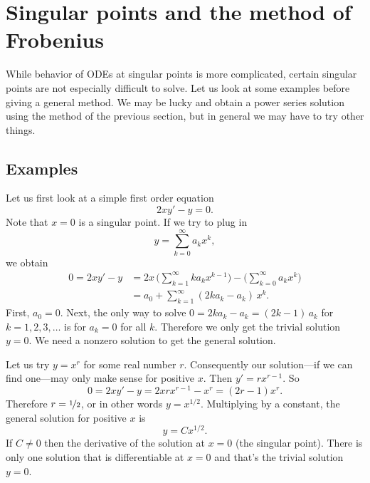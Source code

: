 
\sectionnewpage
\section{Singular points and the method of Frobenius}
\label{frobenius:section}


While behavior of ODEs at singular points is more complicated,
certain singular points are
not especially difficult to solve.  Let us look at some examples
before giving a general method.  We may be lucky and obtain a power series
solution using the method of the previous section, but in general we may
have to try other things.

\subsection{Examples}

\begin{example}
Let us first look at a simple first order equation 
\begin{equation*}
2 x y' - y = 0 .
\end{equation*}
Note that $x=0$ is a singular point.
If we try to plug in
\begin{equation*}
y = \sum_{k=0}^\infty a_k x^k ,
\end{equation*}
we obtain
\begin{equation*}
\begin{split}
0 = 2 xy'-y &= 
2x \, \Biggl( \sum_{k=1}^\infty k a_k x^{k-1}  \Biggr)
-
\Biggl( \sum_{k=0}^\infty a_k x^k \Biggr)
\\
& =
a_0 + 
\sum_{k=1}^\infty (2 k a_k - a_k) \, x^{k} .
\end{split}
\end{equation*}
First, $a_0 = 0$.  Next, the only way to solve
$0 = 2 k a_k - a_k = (2k-1) \, a_k$
for $k = 1,2,3,\dots$ is for $a_k = 0$ for all $k$.
Therefore we only get the trivial solution $y=0$.  We need
a nonzero solution to get the general solution.

Let us try $y=x^r$
for some real number $r$.  
Consequently our solution---if we can
find one---may only make sense for positive $x$.
Then $y' = r x^{r-1}$.  So
\begin{equation*}
0 = 2 x y' - y = 2 x r x^{r-1} - x^r = (2r-1) x^r .
\end{equation*}
Therefore $r= \nicefrac{1}{2}$, or in other words $y = x^{1/2}$.
Multiplying by a constant, the general solution for positive $x$ is
\begin{equation*}
y = C x^{1/2} .
\end{equation*}
If $C \not= 0$ then
the derivative of the solution  at $x=0$ (the
singular point).  There is only one solution that is differentiable
at $x=0$ and that's the trivial solution $y=0$.
\end{example}

